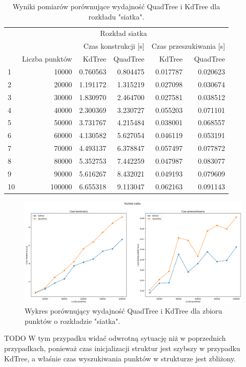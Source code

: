 \documentclass{lab}
\begin{document}
\begin{table}[H]
\centering
\begin{tabular}{lrrrrr}
  \toprule
   & \multicolumn{5}{c}{Rozkład siatka} \\
   &  & \multicolumn{2}{r}{Czas konstrukcji [s]} & \multicolumn{2}{r}{Czas przeszukiwania [s]} \\
   & Liczba punktów & KdTree & QuadTree & KdTree & QuadTree \\
  \midrule
1 & 10000 & 0.760563 & 0.804475 & 0.017787 & 0.020623 \\
2 & 20000 & 1.191172 & 1.315219 & 0.027098 & 0.030674 \\
3 & 30000 & 1.830970 & 2.464700 & 0.027581 & 0.038512 \\
4 & 40000 & 2.300369 & 3.230727 & 0.055203 & 0.071101 \\
5 & 50000 & 3.731767 & 4.215484 & 0.038001 & 0.068557 \\
6 & 60000 & 4.130582 & 5.627054 & 0.046119 & 0.053191 \\
7 & 70000 & 4.493137 & 6.378847 & 0.057497 & 0.077872 \\
8 & 80000 & 5.352753 & 7.442259 & 0.047987 & 0.083077 \\
9 & 90000 & 5.616267 & 8.432021 & 0.049193 & 0.079609 \\
10 & 100000 & 6.655318 & 9.113047 & 0.062163 & 0.091143 \\
  \bottomrule
  \end{tabular}
\caption{Wyniki pomiarów porównujące wydajność QuadTree i KdTree dla rozkładu "siatka".}
\label{tab:grid_time}
\end{table}

\begin{figure}[H]
  \centering
  \includegraphics[width=1\textwidth]{resources/grid_graph.png}
  \caption{Wykres porównujący wydajność QuadTree i KdTree dla zbioru punktów o rozkładzie "siatka".}
  \label{fig:grid_graph}
\end{figure}
TODO
W tym przypadku widać odwrotną sytuację niż w poprzednich przypadkach, ponieważ czas inicjalizacji struktur jest szybszy w przypadku KdTree, a właśnie czas wyszukiwania punktów w strukturze jest zbliżony.
\end{document}
